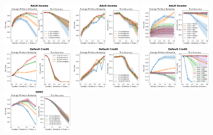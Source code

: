 \begin{figure}[t]
    \centering
    \includegraphics[width=0.325\textwidth]{figures/perturb_adult_samples.png}
    \includegraphics[width=0.325\textwidth]{figures/perturb_adult_samples_bias.png}
    \includegraphics[width=0.325\textwidth]{figures/perturb_adult_layers.png}
    \includegraphics[width=0.325\textwidth]{figures/perturb_default_samples.png}
    \includegraphics[width=0.325\textwidth]{figures/perturb_default_samples_bias.png}
    \includegraphics[width=0.325\textwidth]{figures/perturb_default_layers.png}
    \includegraphics[width=0.325\textwidth]{figures/perturb_gmsc_samples.png}

\end{figure}
